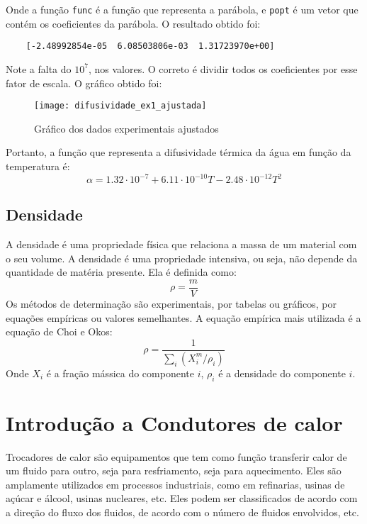 Onde a função \texttt{func} é a função que representa a parábola, e \texttt{popt} é um vetor que
contém os coeficientes da parábola. O resultado obtido foi:
\begin{verbatim}
    [-2.48992854e-05  6.08503806e-03  1.31723970e+00]
\end{verbatim}
Note a falta do \(10^7\), nos valores. O correto é dividir todos os coeficientes por esse fator de
escala. O gráfico obtido foi:
\begin{figure}[H]
    \centering
    \texttt{[image: difusividade\_ex1\_ajustada]}
    \caption{Gráfico dos dados experimentais ajustados}
    \label{fig:grafico_dif_ex1_ajustado}
\end{figure}
Portanto, a função que representa a difusividade térmica da água em função da temperatura é:
\begin{equation}
    \alpha = 1.32 \cdot 10^{-7} + 6.11 \cdot 10^{-10} T - 2.48 \cdot 10^{-12} T^{2}
\end{equation}
\subsection{Densidade}
A densidade é uma propriedade física que relaciona a massa de um material com o seu volume. A
densidade é uma propriedade intensiva, ou seja, não depende da quantidade de matéria presente.
Ela é definida como:
\begin{equation}
    \rho = \frac{m}{V}
\end{equation}
Os métodos de determinação são experimentais, por tabelas ou gráficos, por equações empíricas ou
valores semelhantes. A equação empírica mais utilizada é a equação de Choi e Okos:
\begin{equation}
    \rho = \frac{1}{\sum_{i} \left( X_i^{m}/\rho _{i}   \right) }
\end{equation}
Onde \(X_i\) é a fração mássica do componente \(i\), \(\rho _{i}\) é a densidade do componente \(i\).
\section{Introdução a Condutores de calor}
Trocadores de calor são equipamentos que tem como função transferir calor de um fluido para outro,
seja para resfriamento, seja para aquecimento. Eles são amplamente utilizados em processos
industriais, como em refinarias, usinas de açúcar e álcool, usinas nucleares, etc. Eles podem ser
classificados de acordo com a direção do fluxo dos fluidos, de acordo com o número de fluidos
envolvidos, etc. \par

